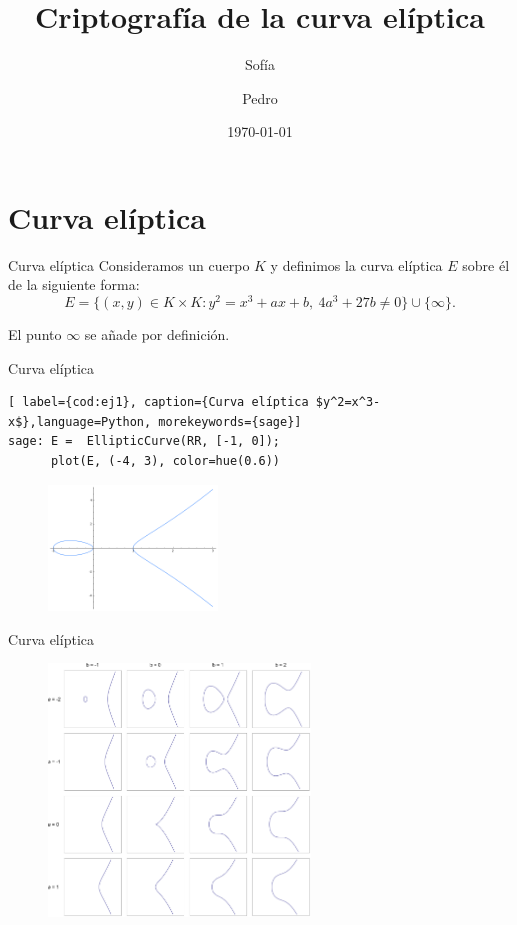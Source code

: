 \documentclass[12pt]{beamer}
\title{Criptografía de la curva elíptica}
\author{Sofía \and Pedro}
\date{\today}
\begin{document}
\frame{\titlepage}

\frame{\tableofcontents}

\section{Curva elíptica}\label{curva}
\begin{frame}[fragile]{Curva elíptica}
Consideramos un cuerpo $K$ y definimos la curva elíptica $E$ sobre él de la siguiente forma:
\[E = \{(x,y) \in K\times K : y^2 = x^3 + ax +b,\ 4a^3+27b \neq 0\} \cup \{\infty\}.
\]

El punto $\infty$ se añade por definición.
\end{frame}

\begin{frame}[fragile]{Curva elíptica}
\begin{lstlisting}[ label={cod:ej1}, caption={Curva elíptica $y^2=x^3-x$},language=Python, morekeywords={sage}]
sage: E =  EllipticCurve(RR, [-1, 0]);
      plot(E, (-4, 3), color=hue(0.6))
\end{lstlisting}

\begin{figure}[H]
    \centering
    \includegraphics[height=0.4\textwidth, width=0.4\textwidth]{ej1}
    \label{fig:ej1}
\end{figure}

\end{frame}

\begin{frame}[fragile]{Curva elíptica}
\begin{figure}[H]
    \centering
    \includegraphics[width=0.62\textwidth]{EllipticCurveCatalog}
    \label{fig:EllipticCurveCatalog}
\end{figure}
\end{frame}
\end{document}
